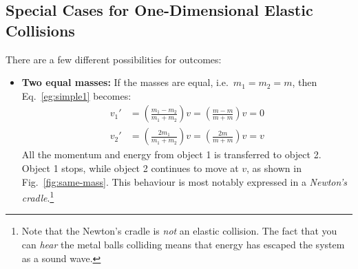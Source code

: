 \subsection{Special Cases for One-Dimensional Elastic Collisions}
There are a few different possibilities for outcomes:
\begin{itemize}[leftmargin=15pt]
\item\textbf{Two equal masses:} If the masses are equal, i.e.\ $m_1=m_2=m$,
  then Eq.~\ref{eg:simple1} becomes:
  \begin{align*}
    v_1'&=\left(\frac{m_1-m_2}{m_1+m_2}\right)v
    =\left(\frac{m-m}{m+m}\right)v=0\\
    v_2'&=\left(\frac{2m_1}{m_1+m_2}\right)v
    =\left(\frac{2m}{m+m}\right)v=v
  \end{align*}
  All the momentum and energy from object 1 is transferred to object 2. Object
  1 stops, while object 2 continues to move at $v$, as shown in
  Fig.~\ref{fig:same-mass}. This behaviour is most notably expressed in a
  \emph{Newton's cradle}.\footnote{Note that the Newton's cradle is \emph{not}
    an elastic collision. The fact that you can \emph{hear} the metal balls
    colliding means that energy has escaped the system as a sound wave.}
  \begin{figure}[ht]
    \centering
\end{figure}
\end{itemize}
